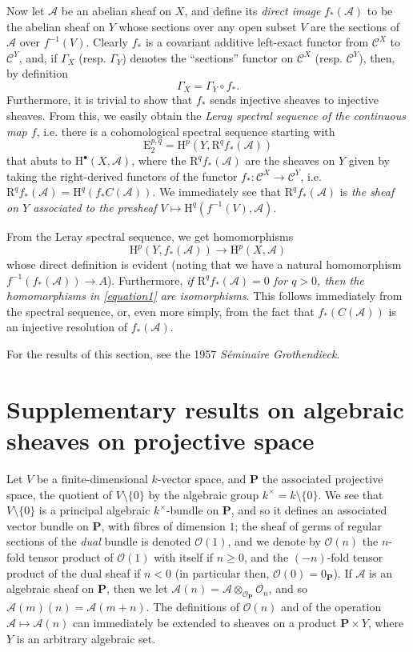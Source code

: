\documentclass{article}
\theoremstyle{plain}
\theoremstyle{definition}
\newcommand{\sh}{\mathscr}
\newcommand{\cat}{\mathcal}
\newcommand{\HH}{\mathrm{H}}
\newcommand{\EE}{\mathrm{E}}
\newcommand{\RR}{\mathrm{R}}
\renewcommand{\geq}{\geqslant}
\newcommand{\oldpage}[1]{\marginpar{\footnotesize$\Big\vert$ \textit{p.~#1}}}
\begin{document}
Now let $\sh{A}$ be an abelian sheaf on $X$, and define its \emph{direct image} $f_*(\sh{A})$ to be the abelian sheaf on $Y$ whose sections over any open subset $V$ are the sections of $\sh{A}$ over $f^{-1}(V)$.
Clearly $f_*$ is a covariant additive left-exact functor from $\cat{C}^X$ to $\cat{C}^Y$, and, if $\Gamma_X$ (resp. $\Gamma_Y$) denotes the ``sections'' functor on $\cat{C}^X$ (resp. $\cat{C}^Y$), then, by definition
\[
  \Gamma_X = \Gamma_Y\circ f_*.
\]
Furthermore, it is trivial to show that $f_*$ sends injective sheaves to injective sheaves.
From this, we easily obtain the \emph{Leray spectral sequence of the continuous map $f$}, i.e. there is a cohomological spectral sequence starting with
\[
  \EE_2^{p,q} = \HH^p(Y,\RR^qf_*(\sh{A}))
\]
that abuts to $\HH^\bullet(X,\sh{A})$, where the $\RR^qf_*(\sh{A})$ are the sheaves on $Y$ given by taking the right-derived functors of the functor $f_*\colon\cat{C}^X\to\cat{C}^Y$, i.e. $\RR^qf_*(\sh{A}) = \HH^q(f_*C(\sh{A}))$.
We immediately see that $\RR^qf_*(\sh{A})$ is \emph{the sheaf on $Y$ associated to the presheaf $V\mapsto\HH^q(f^{-1}(V),\sh{A})$}.

From the Leray spectral sequence, we get homomorphisms
\[
\label{equation1}
  \HH^p(Y,f_*(\sh{A})) \to \HH^p(X,\sh{A})
  \tag{1}
\]
whose direct definition is evident (noting that we have a natural homomorphism $f^{-1}(f_*(\sh{A}))\to A$).
Furthermore, \emph{if $\RR^qf_*(\sh{A})=0$ for $q>0$, then the}
\oldpage{2-06}
\emph{homomorphisms in \cref{equation1} are isomorphisms}.
This follows immediately from the spectral sequence, or, even more simply, from the fact that $f_*(C(\sh{A}))$ is an injective resolution of $f_*(\sh{A})$.

For the results of this section, see the 1957 \emph{S\'{e}minaire Grothendieck}.


\section{Supplementary results on algebraic sheaves on projective space}
\label{section4}

Let $V$ be a finite-dimensional $k$-vector space, and $\mathbf{P}$ the associated projective space, the quotient of $V\setminus\{0\}$ by the algebraic group $k^\times=k\setminus\{0\}$.
We see that $V\setminus\{0\}$ is a principal algebraic $k^\times$-bundle on $\mathbf{P}$, and so it defines an associated vector bundle on $\mathbf{P}$, with fibres of dimension $1$;
the sheaf of germs of regular sections of the \emph{dual} bundle is denoted $\sh{O}(1)$, and we denote by $\sh{O}(n)$ the $n$-fold tensor product of $\sh{O}(1)$ with itself if $n\geq0$, and the $(-n)$-fold tensor product of the dual sheaf if $n<0$ (in particular then, $\sh{O}(0)=\sh{0}_\mathbf{P}$).
If $\sh{A}$ is an algebraic sheaf on $\mathbf{P}$, then we let $\sh{A}(n)=\sh{A}\otimes_{\sh{O}_\mathbf{P}}\sh{O}_n$, and so $\sh{A}(m)(n)=\sh{A}(m+n)$.
The definitions of $\sh{O}(n)$ and of the operation $\sh{A}\mapsto\sh{A}(n)$ can immediately be extended to sheaves on a product $\mathbf{P}\times Y$, where $Y$ is an arbitrary algebraic set.
\end{document}
